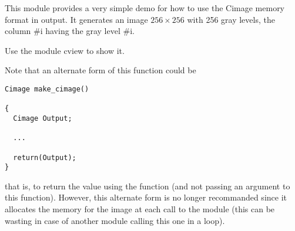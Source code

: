 This module provides a very simple demo for how to use the Cimage memory
format in output.
It generates an image $256 \times 256$ with 256 gray levels, the column \#i having the gray level \#i.

Use the module cview to show it.

Note that an alternate form of this function could be
\begin{verbatim}
Cimage make_cimage()

{
  Cimage Output;

  ...

  return(Output);
}
\end{verbatim}
that is, to return the value using the function (and not passing an argument
to this function).
However, this alternate form is no longer recommanded since it allocates the
memory for the image at each call to the module (this can be wasting in case
of another module calling this one in a loop).

